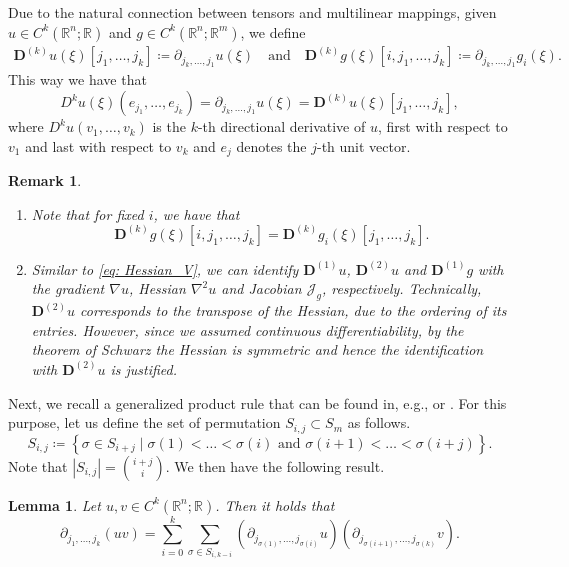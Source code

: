 \documentclass[11pt,reqno]{amsart}
\numberwithin{equation}{section}
\theoremstyle{plain}
\newtheorem{lemma}{Lemma}
\newtheorem{remark}{Remark}
\newcommand{\R}{\mathbb{R}}
\newcommand{\TenDeriv}[1]{\mathbf{D}^{(#1)}}
\begin{document}
Due to the natural connection between tensors and multilinear mappings, given $u\in C^k(\R^n;\R)$ and $g\in C^k(\R^n;\R^m)$, we define
\begin{align*}
  \TenDeriv{k} u(\xi)[j_1,\dots,j_k] \coloneqq \partial_{j_k,\dots,j_1} u(\xi)
\quad \text{and} \quad
  \TenDeriv{k}g(\xi)[i,j_1,\dots,j_k] \coloneqq \partial_{j_k,\dots,j_1} g_i(\xi).
\end{align*}
This way we have that 
\[
  D^ku(\xi)(e_{j_1},\dots,e_{j_k}) = \partial_{j_k,\dots,j_1}u(\xi) = \TenDeriv{k}u(\xi)[j_1,\dots,j_k],
\]
where $D^ku(v_1,\dots,v_k)$ is the $k$-th directional derivative of $u$,  first with respect to $v_1$ and last with respect to $v_k$ and $e_j$ denotes the $j$-th unit vector.
\begin{remark}\label{REM:TensorDeriv}
  ~
  \begin{enumerate}[topsep=0pt]
      \item Note that for fixed $i$, we have that
      \[
      \TenDeriv{k}g(\xi)[i,j_1,\dots,j_k]=\TenDeriv{k}g_i(\xi)[j_1,\dots,j_k].
      \]
      \item Similar to \cref{eq: Hessian_V}, we can identify $\TenDeriv{1}u$, $\TenDeriv{2}u$ and $\TenDeriv{1}g$ with the gradient $\nabla u$, Hessian $\nabla^2 u$ and Jacobian $\mathcal{J}_g$, respectively. Technically,  $\TenDeriv{2}u$  corresponds to the transpose of the Hessian, due to the ordering of its entries. However, since we assumed continuous differentiability, by the theorem of Schwarz the Hessian is symmetric and hence the identification with $\TenDeriv{2}u$ is justified.
  \end{enumerate}
\end{remark}
Next, we recall a generalized product rule that can be found in, e.g., \cite[Proposition 5]{Har06} or \cite[Lemma 12]{BreKP19}. For this purpose, let us define the set of permutation $S_{i,j}\subset S_m$ as follows.
\begin{equation*}
  S_{i,j} \coloneqq \left\{ \sigma \in S_{i+j} \mid \sigma(1)<\dots<\sigma(i) \text{ and } \sigma(i+1)<\dots< \sigma(i+j) \right\}.
\end{equation*}
Note that $|S_{i,j}|= \binom{i+j}{i}$.
We then have the following result.
\begin{lemma}\label{LEM:PartDivProductRule}
  Let $u,v\in C^k(\R^n;\R)$. Then it holds that
  \begin{equation*}
    \partial_{j_1,\dots,j_k} (uv) = \sum_{i=0}^{k} \sum_{\sigma \in S_{i,k-i}} (\partial_{j_{\sigma(1)}, \dots ,j_{\sigma(i)}} u) (\partial_{j_{\sigma(i+1)}, \dots ,j_{\sigma(k)}}v).
  \end{equation*}
\end{lemma}
\end{document}
